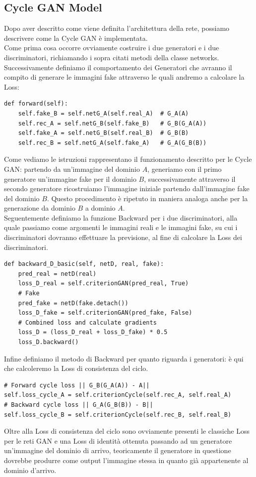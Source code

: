 \subsection{Cycle GAN Model}
Dopo aver descritto come viene definita l'architettura della rete, possiamo descrivere come la Cycle GAN è implementata. 
\\Come prima cosa occorre ovviamente costruire i due generatori e i due discriminatori, richiamando i sopra citati metodi della classe networks.
Successivamente definiamo il comportamento dei Generatori che avranno il compito di generare le immagini fake attraverso le quali andremo a calcolare la Loss:
\begin{verbatim}
def forward(self):
    self.fake_B = self.netG_A(self.real_A)  # G_A(A)
    self.rec_A = self.netG_B(self.fake_B)   # G_B(G_A(A))
    self.fake_A = self.netG_B(self.real_B)  # G_B(B)
    self.rec_B = self.netG_A(self.fake_A)   # G_A(G_B(B))
\end{verbatim}
Come vediamo le istruzioni rappresentano il funzionamento descritto per le Cycle GAN: partendo da un'immagine del dominio $A$, generiamo con il primo generatore un'immagine fake per il dominio $B$, successivamente attraverso il secondo generatore ricostruiamo l'immagine iniziale partendo dall'immagine fake del dominio $B$. Questo procedimento è ripetuto in maniera analoga anche per la generazione da dominio $B$ a dominio $A$.
\\Seguentemente definiamo la funzione Backward per i due discriminatori, alla quale passiamo come argomenti le immagini reali e le immagini fake, su cui i discriminatori dovranno effettuare la previsione, al fine di calcolare la Loss dei discriminatori.
\begin{verbatim}
def backward_D_basic(self, netD, real, fake):
    pred_real = netD(real)
    loss_D_real = self.criterionGAN(pred_real, True)
    # Fake
    pred_fake = netD(fake.detach())
    loss_D_fake = self.criterionGAN(pred_fake, False)
    # Combined loss and calculate gradients
    loss_D = (loss_D_real + loss_D_fake) * 0.5
    loss_D.backward()
\end{verbatim}
Infine definiamo il metodo di Backward per quanto riguarda i generatori: è qui che calcoleremo la Loss di consistenza del ciclo. 
\begin{verbatim}
# Forward cycle loss || G_B(G_A(A)) - A||
self.loss_cycle_A = self.criterionCycle(self.rec_A, self.real_A)
# Backward cycle loss || G_A(G_B(B)) - B||
self.loss_cycle_B = self.criterionCycle(self.rec_B, self.real_B)
\end{verbatim}
Oltre alla Loss di consistenza del ciclo sono ovviamente presenti le classiche Loss per le reti GAN e una Loss di identità ottenuta passando ad un generatore un'immagine del dominio di arrivo, teoricamente il generatore in questione dovrebbe produrre come output l'immagine stessa in quanto già appartenente al dominio d'arrivo.

